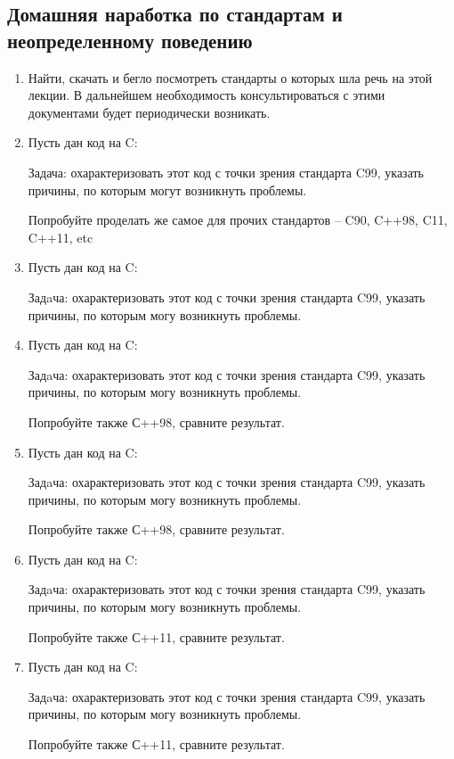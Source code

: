 \documentclass[a4paper,12pt,oneside]{article}
\begin{document}
\subsection{Домашняя наработка по стандартам и неопределенному поведению}\label{StandHomework}
\begin{enumerate}
\item
Найти, скачать и бегло посмотреть стандарты о которых шла речь на этой лекции. В дальнейшем необходимость консультироваться с этими документами будет периодически возникать.
\item
Пусть дан код на C:



Задача: охарактеризовать этот код с точки зрения стандарта C99, указать причины, по которым могут возникнуть проблемы.

Попробуйте проделать же самое для прочих стандартов -- C90, C++98, C11, C++11, etc

\item
Пусть дан код на C:



Задaча: охарактеризовать этот код с точки зрения стандарта C99, указать причины, по которым могу возникнуть проблемы.

\item
Пусть дан код на C:



Задaча: охарактеризовать этот код с точки зрения стандарта C99, указать причины, по которым могу возникнуть проблемы.

Попробуйте также С++98, сравните результат.

\item
Пусть дан код на C:



Задaча: охарактеризовать этот код с точки зрения стандарта C99, указать причины, по которым могу возникнуть проблемы. 

Попробуйте также С++98, сравните результат.

\item
Пусть дан код на C:



Задaча: охарактеризовать этот код с точки зрения стандарта C99, указать причины, по которым могу возникнуть проблемы.

Попробуйте также С++11, сравните результат.

\item
Пусть дан код на C:



Задaча: охарактеризовать этот код с точки зрения стандарта C99, указать причины, по которым могу возникнуть проблемы.

Попробуйте также С++11, сравните результат.

\end{enumerate}
\end{document}
